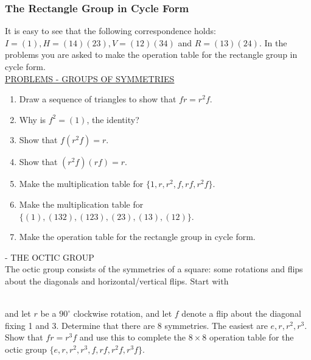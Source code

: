 \documentclass[12pt]{book}
\theoremstyle{definition}
\begin{document}
\subsubsection{The Rectangle Group in Cycle Form}
It is easy to see that the following correspondence holds: $ I=(1), H=(14)(23), V=(12)(34) $ and $ R=(13)(24) $. In the problems you are asked to make the operation table for the rectangle group in cycle form.\\[.2in]
\underline{PROBLEMS - GROUPS OF SYMMETRIES}

\begin{enumerate}
	\item Draw a sequence of triangles to show that $ fr=r^2f $.
	\item Why is $ f^2=(1) $, the identity?
	\item Show that $ f(r^2f)=r $.
	\item Show that $ (r^2f)(rf)=r $.
	\item Make the multiplication table for $ \{1,r,r^2,f,rf,r^2f\} $.
	\item Make the multiplication table for $ \{(1),(132),(123),(23),(13),(12)\} $.
	\item Make the operation table for the rectangle group in cycle form.
	
\end{enumerate}
\clearpage
{} - THE OCTIC GROUP \\[.2in]
The octic group consists of the symmetries of a square: some rotations and flips about the diagonals and horizontal/vertical flips.  Start with
~\\
\begin{figure}[h!]
	\centering
	
\end{figure}
~\\	
and let $ r $ be a $ 90^\circ $ clockwise rotation, and let $ f $ denote a flip about the diagonal fixing 1 and 3. Determine that there are 8 symmetries. The easiest are $ e,r,r^2,r^3.  $ Show that $ fr=r^3f $ and use this to complete the $ 8\times 8 $ operation table for the octic group $\{ e,r,r^2,r^3,f,rf,r^2f,r^3f\}. $\clearpage
\end{document}

